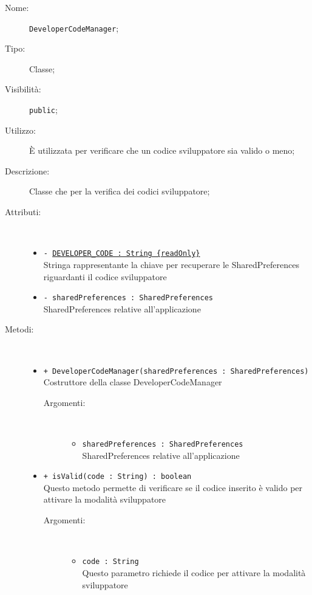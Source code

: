 \documentclass[../DefinizioneDiProdotto.tex]{subfiles}
\begin{document}
\begin{description}
	\item[Nome:] \texttt{DeveloperCodeManager};
	\item[Tipo:] Classe;
	\item[Visibilità:] \texttt{public};
	\item[Utilizzo:] È utilizzata per verificare che un codice sviluppatore sia valido o meno;
	\item[Descrizione:] Classe che per la verifica dei codici sviluppatore;
	\item[Attributi:] \
	\begin{itemize}
		\item \texttt{- \underline{DEVELOPER\_CODE : String \{readOnly\}}}\\
		Stringa rappresentante la chiave per recuperare le SharedPreferences riguardanti il codice sviluppatore
		
		\item \texttt{- sharedPreferences : SharedPreferences}\\
		SharedPreferences relative all'applicazione
		
	\end{itemize}
	\item[Metodi:] \
	\begin{itemize}
		\item \texttt{+ DeveloperCodeManager(sharedPreferences : SharedPreferences)}\\
		Costruttore della classe DeveloperCodeManager
		\begin{description}
			\item[Argomenti:] \
			\begin{itemize}
				\item \texttt{sharedPreferences : SharedPreferences}\\
				SharedPreferences relative all'applicazione\end{itemize}
		\end{description}
		\item \texttt{+ isValid(code : String) : boolean}\\
		Questo metodo permette di verificare se il codice inserito è valido per attivare la modalità sviluppatore
		\begin{description}
			\item[Argomenti:] \
			\begin{itemize}
				\item \texttt{code : String}\\
				Questo parametro richiede il codice per attivare la modalità sviluppatore\end{itemize}
		\end{description}
	\end{itemize}
\end{description}
\end{document}
